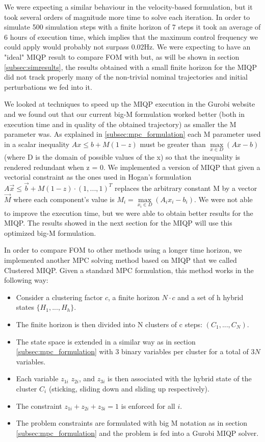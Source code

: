 \documentclass[12,twoside]{TFG-GM}
\theoremstyle{definition}
\theoremstyle{remark}
\begin{document}
We were expecting a similar behaviour in the velocity-based formulation, but it took several orders of magnitude more time to solve each iteration. In order to simulate 500 simulation steps with a finite horizon of 7 steps it took an average of 6 hours of execution time, which implies that the maximum control frequency we could apply would probably not surpass 0.02Hz. We were expecting to have an "ideal" MIQP result to compare FOM with but, as will be shown in section \ref{subsec:simresults}, the results obtained with a small finite horizon for the MIQP did not track properly many of the non-trivial nominal trajectories and initial perturbations we fed into it.

We looked at techniques to speed up the MIQP execution in the Gurobi website and we found out that our current big-M formulation worked better (both in execution time and in quality of the obtained trajectory) as smaller the M parameter was. As explained in \ref{subsec:mpc_formulation} each M parameter used in a scalar inequality $Ax \leq b + M (1 - z)$ must be greater than $\max\limits_{x \in D}{(Ax - b)}$ (where D is the domain of possible values of the x) so that the inequality is rendered redundant when z = 0. We implemented a version of MIQP that given a vectorial constraint as the ones used in Hogan's formulation $A\vec{x} \leq \vec{b} + M (1 - z) \cdot (1, ..., 1)^T$ replaces the arbitrary constant M by a vector $\vec{M}$ where each component's value is $M_i = \max\limits_{x_i \in D}{(A_i x_i - b_i)}$. We were not able to improve the execution time, but we were able to obtain better results for the MIQP. The results showed in the next section for the MIQP will use this optimized big-M formulation.

In order to compare FOM to other methods using a longer time horizon, we implemented another MPC solving method based on MIQP that we called Clustered MIQP. Given a standard MPC formulation, this method works in the following way:

\begin{itemize}
\item Consider a clustering factor $c$, a finite horizon $ N \cdot c$ and a set of h hybrid states $ \{ H_1, ..., H_h \}$.
\item The finite horizon is then divided into N clusters of c steps: $(C_1, ..., C_N)$.
\item The state space is extended in a similar way as in section \ref{subsec:mpc_formulation} with 3 binary variables per cluster for a total of $3N$ variables.
\item Each variable $z_{1i}$ $z_{2i}$, and $z_{3i}$ is then associated with the hybrid state of the cluster $C_i$ (sticking, sliding down and sliding up respectively).
\item The constraint $z_{1i} + z_{2i} + z_{3i} = 1$ is enforced for all $i$.
\item The problem constraints are formulated with big M notation as in section \ref{subsec:mpc_formulation} and the problem is fed into a Gurobi MIQP solver.
\end{itemize}
\end{document}
